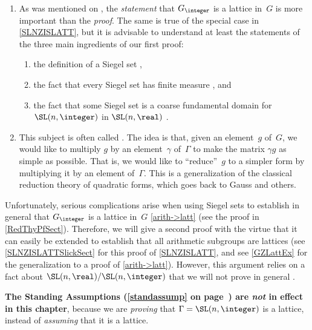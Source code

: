 \begin{rems} \ 
\noprelistbreak
	\begin{enumerate}
	\item As was mentioned on , the \emph{statement} that $G_\integer$ is a lattice in~$G$ is more important than the \emph{proof}. The same is true of the special case in \cref{SLNZISLATT}, but it is advisable to understand at least the statements of the three main ingredients of our first proof:
	\begin{enumerate}
	\item the definition of a Siegel set ,
	\item the fact that every Siegel set has finite measure , 
	and
	\item the fact that some Siegel set is a coarse fundamental domain for $\SL(n,\integer)$ in $\SL(n,\real)$ .
	\end{enumerate}
	
	\item This subject is often called .
The idea is that, given an element~$g$ of~$G$, we would like to multiply $g$ by an element~$\gamma$ of~$\Gamma$ to make the matrix $\gamma g$ as simple as possible. That is, we would like to ``reduce''~$g$ to a simpler form by multiplying it by an element of~$\Gamma$. This is a generalization of the classical reduction theory of quadratic forms, which goes back to Gauss and others.

	\end{enumerate}
\end{rems}



Unfortunately, serious complications arise when using Siegel sets to establish in general that $G_\integer$ is a lattice in~$G$ \cref{arith->latt} (see the proof in \cref{RedThyPfSect}). Therefore, we will give a second proof with the virtue that it can easily be extended to establish that all arithmetic subgroups are lattices (see \cref{SLNZISLATTSlickSect} for this proof of \cref{SLNZISLATT}, and see \cref{GZLattEx} for the generalization to a proof of \cref{arith->latt}). However, this argument relies on a fact about $\SL(n,\real)/\SL(n,\integer)$ that we will not prove in general .


\begin{warn}
 \textbf{The Standing Assumptions (\ref{standassump} on page~\pageref{standassump}) are \emph{not} in effect in this chapter}, because we are \emph{proving} that $\Gamma = \SL(n,\integer)$ is a lattice, instead of \emph{assuming} that it is a lattice. 
 \end{warn}










